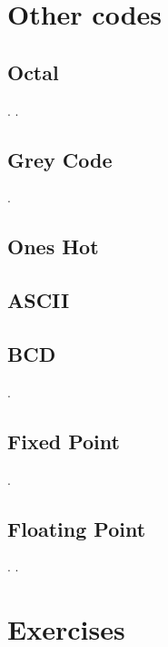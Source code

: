 \section{Other codes}

\subsection{Octal}
\pagebreak
.
\pagebreak
.

\subsection{Grey Code}
\pagebreak
.

\subsection{Ones Hot}

\subsection{ASCII}

\subsection{BCD}
\pagebreak
.

\subsection{Fixed Point}
\pagebreak
.

\subsection{Floating Point}
\pagebreak
.
\pagebreak
.



\section{Exercises}

